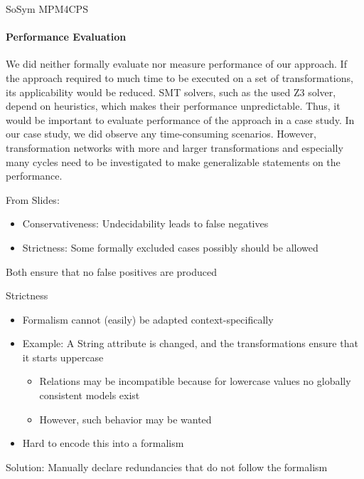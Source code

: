 \begin{copiedFrom}{SoSym MPM4CPS}
\paragraph{Performance Evaluation}
We did neither formally evaluate nor measure performance of our approach.
If the approach required to much time to be executed on a set of transformations, its applicability would be reduced.
SMT solvers, such as the used Z3 solver, depend on heuristics, which makes their performance unpredictable.
Thus, it would be important to evaluate performance of the approach in a case study.
In our case study, %
we did observe any time-consuming scenarios.
However, transformation networks with more and larger transformations and especially many cycles need to be investigated to make generalizable statements on the performance.


From Slides:
\begin{itemize}
    \item Conservativeness: Undecidability leads to false negatives
    \item Strictness: Some formally excluded cases possibly should be allowed
\end{itemize}
Both ensure that no false positives are produced

Strictness
\begin{itemize}
    \item Formalism cannot (easily) be adapted context-specifically
    \item Example: A String attribute is changed, and the transformations ensure that it starts uppercase
    \begin{itemize}
        \item Relations may be incompatible because for lowercase values no globally consistent models exist
        \item However, such behavior may be wanted
    \end{itemize}
    \item Hard to encode this into a formalism
\end{itemize}
Solution: Manually declare redundancies that do not follow the formalism


\iffalse
Functional correctness:
    - Theoretical evaluation based on concepts and definitions of this paper
    -> Functioning of the procedure, algorithms
    
Applicability:
    - Empirical evaluation based on an implementation of the decomposition procedure
    - Interpretation of test results + metric achieved results against expected results
    -> Example scenarios, execution results
\fi

\end{copiedFrom} %




